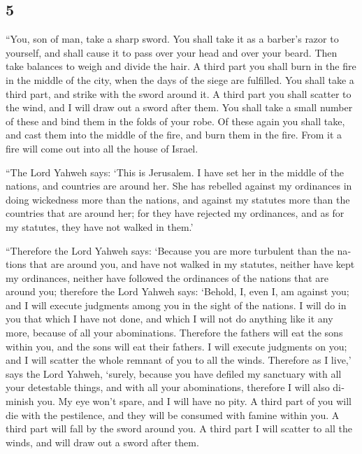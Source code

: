 \begin{paracol}{2}
\begin{otherlanguage}{english}
\hypertarget{section-9}{%
\section{5}\label{section-9}}

 ``You, son of man, take a sharp sword. You shall take it
as a barber's razor to yourself, and shall cause it to pass over your
head and over your beard. Then take balances to weigh and divide the
hair.  A third part you shall burn in the fire in the
middle of the city, when the days of the siege are fulfilled. You shall
take a third part, and strike with the sword around it. A third part you
shall scatter to the wind, and I will draw out a sword after them.
 You shall take a small number of these and bind them in
the folds of your robe.  Of these again you shall take,
and cast them into the middle of the fire, and burn them in the fire.
From it a fire will come out into all the house of Israel.

 ``The Lord Yahweh says: `This is Jerusalem. I have set
her in the middle of the nations, and countries are around her.
 She has rebelled against my ordinances in doing
wickedness more than the nations, and against my statutes more than the
countries that are around her; for they have rejected my ordinances, and
as for my statutes, they have not walked in them.'

 ``Therefore the Lord Yahweh says: `Because you are more
turbulent than the nations that are around you, and have not walked in
my statutes, neither have kept my ordinances, neither have followed the
ordinances of the nations that are around you;  therefore
the Lord Yahweh says: `Behold, I, even I, am against you; and I will
execute judgments among you in the sight of the nations. 
I will do in you that which I have not done, and which I will not do
anything like it any more, because of all your abominations.
 Therefore the fathers will eat the sons within you, and
the sons will eat their fathers. I will execute judgments on you; and I
will scatter the whole remnant of you to all the winds. 
Therefore as I live,' says the Lord Yahweh, `surely, because you have
defiled my sanctuary with all your detestable things, and with all your
abominations, therefore I will also diminish you. My eye won't spare,
and I will have no pity.  A third part of you will die
with the pestilence, and they will be consumed with famine within you. A
third part will fall by the sword around you. A third part I will
scatter to all the winds, and will draw out a sword after them.


\end{otherlanguage}
\end{paracol}
